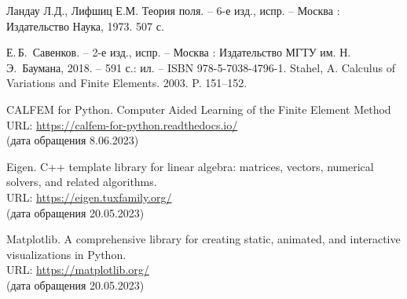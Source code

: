 \documentclass[12pt, a4paper]{article}
\begin{document}
	\begin{thebibliography}{4}
		
		 Ландау Л.Д., Лифшиц Е.М. Теория поля. -- 6-е изд., испр. -- Москва : Издательство Наука, 1973. 507 с.
		
		  Е.\,Б.~Савенков. -- 2-е изд., испр. -- Москва : Издательство МГТУ им. Н.\,Э.~Баумана, 2018. -- 591 с.: ил. 
		-- ISBN 978-5-7038-4796-1.
		 Stahel, A. Calculus of Variations and Finite Elements. 2003. P. 151--152.
		
		 CALFEM for Python. Computer Aided Learning of the Finite Element Method \\
		URL:  \href{https://calfem-for-python.readthedocs.io}{https://calfem-for-python.readthedocs.io/} \\
		(дата обращения 8.06.2023)	
		
		
		 Eigen. C++ template library for linear algebra: matrices, vectors, numerical solvers, and related algorithms. \\
		URL:  \href{https://eigen.tuxfamily.org}{https://eigen.tuxfamily.org/} \\
		(дата обращения 20.05.2023)
					
		
		
		 Matplotlib. A comprehensive library for creating static, animated, and interactive visualizations in Python.  \\
		URL:  \href{https://matplotlib.org/}{https://matplotlib.org/} \\
		(дата обращения 20.05.2023)
		
		
		
	\end{thebibliography}
	
\end{document}
